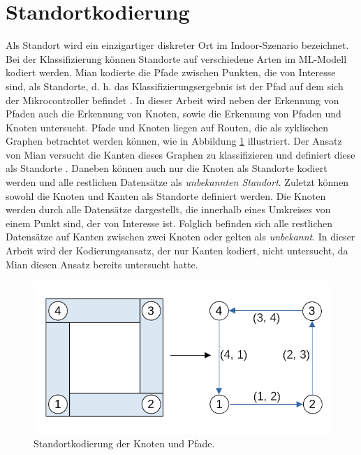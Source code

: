 \section{Standortkodierung}
\label{sec:model_location_encoding}
Als Standort wird ein einzigartiger diskreter Ort im Indoor-Szenario bezeichnet.
Bei der Klassifizierung können Standorte auf verschiedene Arten im ML-Modell kodiert werden.
Mian kodierte die Pfade zwischen Punkten, die von Interesse sind, als Standorte,
d. h. das Klassifizierungsergebnis ist der Pfad auf dem sich der Mikrocontroller befindet \cite{naveedThesis}.
\newline
\newline
In dieser Arbeit wird neben der Erkennung von Pfaden auch die Erkennung von Knoten, sowie die Erkennung von Pfaden und Knoten untersucht.
Pfade und Knoten liegen auf Routen, die als zyklischen Graphen betrachtet werden können, wie in Abbildung \ref{fig:location_encoding} illustriert.
Der Ansatz von Mian versucht die Kanten dieses Graphen zu klassifizieren und definiert diese als Standorte \cite{naveedThesis}.
Daneben können auch nur die Knoten als Standorte kodiert werden und alle restlichen Datensätze als \textit{unbekannten Standort}.
Zuletzt können sowohl die Knoten und Kanten als Standorte definiert werden.
Die Knoten werden durch alle Datensätze dargestellt, die innerhalb eines Umkreises von einem Punkt sind, der von Interesse ist.
Folglich befinden sich alle restlichen Datensätze auf Kanten zwischen zwei Knoten oder gelten als \textit{unbekannt}.
In dieser Arbeit wird der Kodierungsansatz, der nur Kanten kodiert, nicht untersucht, da Mian diesen Ansatz bereits untersucht hatte.
\begin{figure}[h!]
    \centering
    \includegraphics[width=\linewidth]{images/location_encoding.png}
    \caption{Standortkodierung der Knoten und Pfade.}
    \label{fig:location_encoding}
\end{figure}
